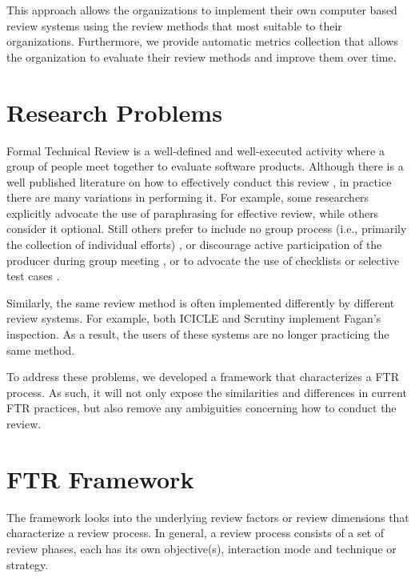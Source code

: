 This approach allows the organizations to implement their own computer
based review systems using the review methods that most suitable to their
organizations. Furthermore, we provide 
automatic metrics collection that allows the organization to
evaluate their review methods and improve them over time.


\section {Research Problems}
Formal Technical Review is a well-defined and well-executed activity
where a group of people meet together to evaluate software products.
Although there is a well published literature on how to
effectively conduct this review \cite{Fagan76}, in
practice there are many variations in performing it.
For example, some researchers
\cite{Fagan76,Russell91} explicitly advocate the use of paraphrasing
for effective review, while others \cite{Humphrey90} consider it
optional. Still others prefer to include no group process (i.e.,
primarily the collection of individual efforts)
\cite{Votta93}, or discourage active participation of the producer
during group meeting \cite{Ackerman89,Russell91},  or to advocate the
use of checklists \cite{Fagan76,Humphrey90,Freedman90} or selective
test cases \cite{Ackerman89,Dunn84}. 

Similarly, the same review method is often 
implemented differently by different review systems. For example, both
ICICLE \cite{Brothers90} and Scrutiny \cite{Gintell93} implement
Fagan's inspection.  As a result, the users of these systems are no
longer practicing the same method.

To address these problems, we developed a framework that
characterizes a FTR process. As such, it will not only expose the
similarities and differences in current FTR practices, but also remove
any ambiguities concerning how to conduct the review.


\section {FTR Framework}

The framework looks into the underlying review factors or review
dimensions that characterize a review process. In general, a review
process consists of a set of review phases, each has its own
objective(s), interaction mode and technique or strategy.

